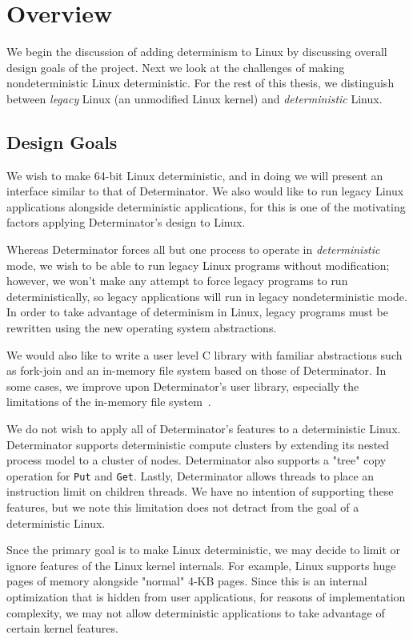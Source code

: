 \section{Overview}

We begin the discussion of adding determinism to Linux by discussing overall
design goals of the project. Next we look at the challenges of making
nondeterministic Linux deterministic. For the rest of this thesis, we
distinguish between \emph{legacy} Linux (an unmodified Linux kernel) and
\emph{deterministic} Linux.

\subsection{Design Goals}

We wish to make 64-bit Linux deterministic, and in doing we will present an
interface similar to that of Determinator. We also would like to run legacy
Linux applications alongside deterministic applications, for this is one of the
motivating factors applying Determinator's design to Linux.

Whereas Determinator forces all but one process to operate in
\emph{deterministic} mode, we wish to be able to run legacy Linux programs
without modification; however, we won't make any attempt to force legacy
programs to run deterministically, so legacy applications will run in legacy
nondeterministic mode. In order to take advantage of determinism in Linux,
legacy programs must be rewritten using the new operating system abstractions.

We would also like to write a user level C library with familiar abstractions
such as fork-join and an in-memory file system based on those of Determinator.
In some cases, we improve upon Determinator's user library, especially the
limitations of the in-memory file system~\cite{Aviram10,Aviram10cloud}.

We do not wish to apply all of Determinator's features to a deterministic Linux.
Determinator supports deterministic compute clusters by extending its nested
process model to a cluster of nodes. Determinator also supports a "tree" copy
operation for {\tt Put} and {\tt Get}. Lastly, Determinator allows threads to
place an instruction limit on children threads. We have no intention of
supporting these features, but we note this limitation does not detract from the
goal of a deterministic Linux.

Snce the primary goal is to make Linux deterministic, we may decide
to limit or ignore features of the Linux kernel internals. For example, Linux
supports huge pages of memory alongside "normal" 4-KB pages. Since this is an
internal optimization that is hidden from user applications, for reasons of
implementation complexity, we may not allow deterministic applications to take
advantage of certain kernel features.

